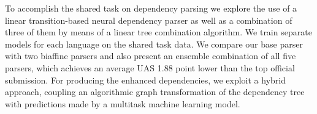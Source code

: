 To accomplish the shared task on dependency parsing we explore the use of a linear transition-based neural dependency parser as well as a combination of three of them by means of a linear tree combination algorithm. We train separate models for each language on the shared task data. We compare our base parser with two biaffine parsers and also present an ensemble combination of all five parsers, which achieves an average UAS 1.88 point lower than the top official submission. For producing the enhanced dependencies, we exploit a hybrid approach, coupling an algorithmic graph transformation of the dependency tree with predictions made by a multitask machine learning model.
